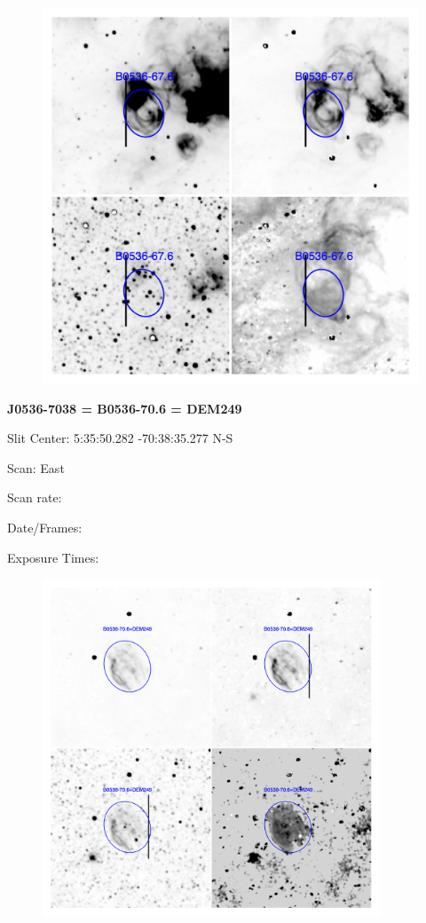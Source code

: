 \documentclass[11pt]{article}
\begin{document}
\begin{figure}
\includegraphics[width=12.5cm]{snapshots/B0536-676.png}
\end{figure}


\newpage
{\bf J0536-7038 = B0536-70.6 = DEM249}  
 
Slit Center:   5:35:50.282   -70:38:35.277 N-S

Scan:  East

Scan rate:  

Date/Frames:

Exposure Times:  

\begin{figure}
\includegraphics[width=10.05cm]{snapshots/B0536-706.png}
\end{figure}
\end{document}
